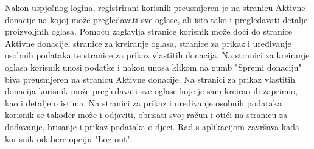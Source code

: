 			Nakon uspješnog logina, registrirani korisnik preusmjeren je na stranicu Aktivne donacije na kojoj može pregledavati sve oglase, ali isto tako i pregledavati detalje proizvoljnih oglasa. Pomoću zaglavlja stranice korisnik može doći do stranice Aktivne donacije, stranice za kreiranje oglasa, stranice za prikaz i uređivanje osobnih podataka te stranice za prikaz vlastitih donacija. Na stranici za kreiranje oglasa korisnik unosi podatke i nakon unosa klikom na gumb "Spremi donaciju" biva preusmjeren na stranicu Aktivne donacije. Na stranici za prikaz vlastitih donacija korisnik može pregledavati sve oglase koje je sam kreirao ili zaprimio, kao i detalje o istima. Na stranici za prikaz i uređivanje osobnih podataka korisnik se također može i odjaviti, obrisati svoj račun i otići na stranicu za dodavanje, brisanje i prikaz podataka o djeci. Rad s aplikacijom završava kada korisnik odabere opciju "Log out".

                \eject
		
			
			
			
		
		
